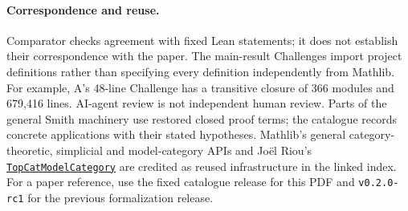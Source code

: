 \paragraph{Correspondence and reuse.}
Comparator checks agreement with fixed Lean statements;
it does not establish their correspondence with the paper.
The main-result Challenges import project definitions rather than specifying every definition independently from Mathlib.
For example, A's 48-line Challenge has a transitive closure of 366 modules and 679,416 lines.
AI-agent review is not independent human review.
Parts of the general Smith machinery use restored closed proof terms;
the catalogue records concrete applications with their stated hypotheses.
Mathlib's general category-theoretic, simplicial and model-category APIs and
Jo\"el Riou's
\href{https://github.com/joelriou/topcat-model-category/tree/6c0c356fea469689fe76baeb47ba773460dfacee}{\texttt{TopCatModelCategory}}
are credited as reused infrastructure in the linked index.
For a paper reference, use the fixed catalogue release for this PDF and
\texttt{v0.2.0-rc1} for the previous formalization release.
